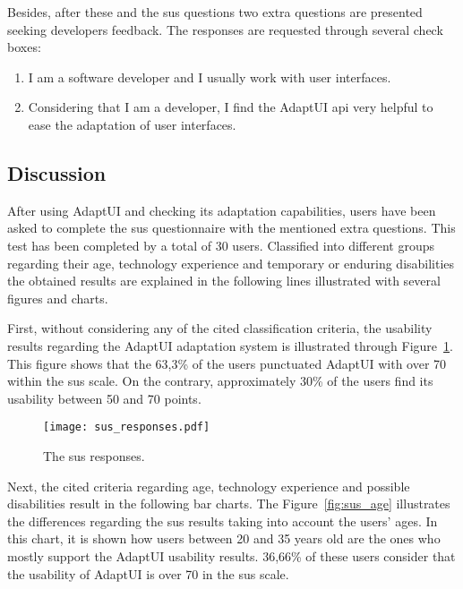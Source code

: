 Besides, after these and the \ac{sus} questions two extra questions are presented
seeking developers feedback. The responses are requested through several check 
boxes:

\begin{enumerate}[label=\alph*)]
  \item I am a software developer and I usually work with user interfaces.
  \item Considering that I am a developer, I find the AdaptUI \ac{api} very
  helpful to ease the adaptation of user interfaces.
\end{enumerate}


\subsection{Discussion}
\label{sec:user_evaluation_discussion}

After using AdaptUI and checking its adaptation capabilities, users have been 
asked to complete the \ac{sus} questionnaire with the mentioned extra questions. 
This test has been completed by a total of 30 users. Classified into different 
groups regarding their age, technology experience and temporary or enduring 
disabilities the obtained results are explained in the following lines illustrated 
with several figures and charts.

First, without considering any of the cited classification criteria, the usability 
results regarding the AdaptUI adaptation system is illustrated through 
Figure~\ref{fig:sus_responses}. This figure shows that the 63,3\% of the users
punctuated AdaptUI with over 70 within the \ac{sus} scale. On the contrary, 
approximately 30\% of the users find its usability between 50 and 70 points.

\begin{figure}
\centering
\texttt{[image: sus\_responses.pdf]}
\caption{The \ac{sus} responses.}
\label{fig:sus_responses}
\end{figure}

Next, the cited criteria regarding age, technology experience and possible
disabilities result in the following bar charts. The Figure~\ref{fig:sus_age}
illustrates the differences regarding the \ac{sus} results taking into account the
users' ages. In this chart, it is shown how users between 20 and 35 years old
are the ones who mostly support the AdaptUI usability results. 36,66\% of
these users consider that the usability of AdaptUI is over 70 in the \ac{sus} scale.

